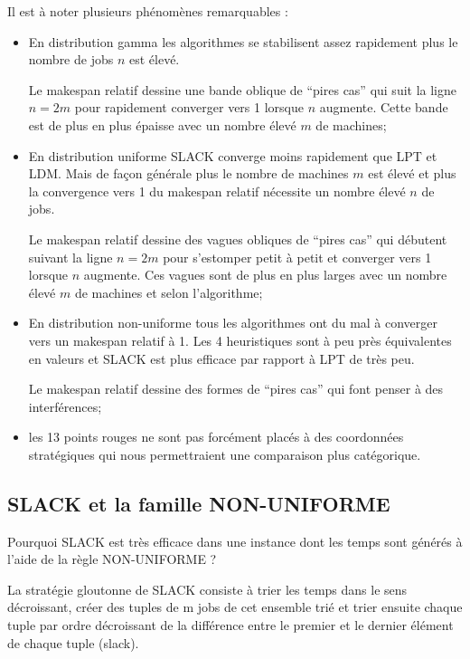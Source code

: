 \documentclass[a4paper,12pt]{report}
\theoremstyle{plain}				%
\theoremstyle{definition}				%
\begin{document}
Il est à noter plusieurs phénomènes remarquables :
\begin{itemize}
	\item En distribution gamma les algorithmes se stabilisent 
	assez rapidement plus le nombre de jobs $n$ est élevé.
	
	Le makespan relatif dessine une bande oblique de ``pires cas'' 
	qui suit la ligne $n = 2m$ pour rapidement converger vers 1 
	lorsque $n$ augmente. 
	Cette bande est de plus en plus épaisse avec un nombre 
	élevé $m$ de machines;
	 
	\item En distribution uniforme SLACK converge moins rapidement que 
	LPT et LDM. Mais de façon générale plus le nombre de machines $m$ 
	est élevé et plus la convergence vers 1 du makespan relatif nécessite 
	un nombre élevé $n$ de jobs.
	
	Le makespan relatif dessine des vagues obliques de ``pires cas'' 
	qui débutent suivant la ligne $n = 2m$ pour s'estomper petit à petit 
	et converger vers 1 lorsque $n$ augmente. 
	Ces vagues sont de plus en plus larges avec un nombre 
	élevé $m$ de machines et selon l'algorithme;
	
	\item En distribution non-uniforme tous les algorithmes ont du mal 
	à converger vers un makespan relatif à 1. Les 4 heuristiques sont à 
	peu près équivalentes en valeurs et SLACK est plus efficace par 
	rapport à LPT de très peu.
	
	Le makespan relatif dessine des formes de ``pires cas'' qui font penser 
	à des interférences;
	
	\item les 13 points rouges ne sont pas forcément placés à des 
	coordonnées stratégiques qui nous permettraient une comparaison 
	plus catégorique. 
\end{itemize}

\subsection{SLACK et la famille NON-UNIFORME}
\label{ssec:resultatsSLACKNonUniforme}

Pourquoi SLACK est très efficace dans une instance dont les temps sont générés à l'aide de la
  règle NON-UNIFORME ? 
  
La stratégie gloutonne de SLACK consiste à 
  trier les temps dans le sens décroissant,
  créer des tuples de m jobs de cet ensemble trié 
  et trier ensuite chaque tuple par ordre décroissant de la différence 
  entre le premier et le dernier élément de chaque tuple (slack).
\end{document}
